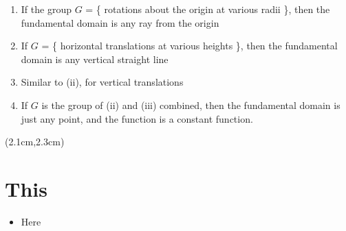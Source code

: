 \begin{preview}
\begin{minipage}{\textwidth}
\begin{enumerate}[label=(\roman*)]
	\item If the group $G$ = \{ rotations about the origin at various radii \}, then the fundamental domain is any ray from the origin
	
	\item If $G$ = \{ horizontal translations at various heights \}, then the fundamental domain is any vertical straight line
	
	\item Similar to (ii), for vertical translations

	\item If $G$ is the group of (ii) and (iii) combined, then the fundamental domain is just any point, and the function is a constant function.
\end{enumerate}

\end{minipage}
\end{preview}

\begin{preview}
\begin{textblock*}{5cm}(2.1cm,2.3cm) %
	{\color{red}{\large \textcircled{\small \themypage}}}
	\addtocounter{mypage}{1}
\end{textblock*}

\begin{minipage}{\textwidth}
	\setlength{\parskip}{0.4\baselineskip}

\section{This}

\begin{itemize}
	\item Here
\end{itemize}

\end{minipage}
\end{preview}


